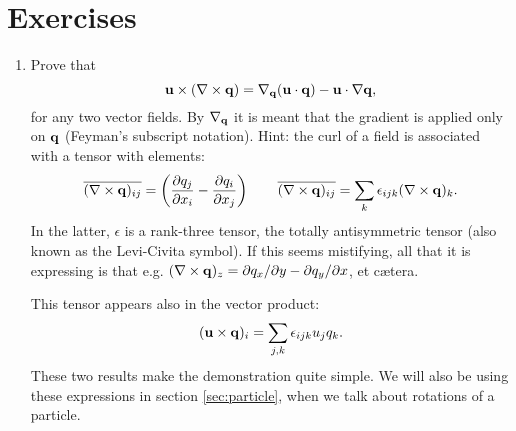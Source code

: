 \section{Exercises}
\label{sec:Euler_exercises}

\begin{enumerate}
\item \label{ex:vector_identity} Prove that
\[
\mathbf{u} \times ( \nabla\times \mathbf{q}) =
\nabla_{\mathbf{q}} (\mathbf{u}\cdot\mathbf{q}) - \mathbf{u} \cdot \nabla \mathbf{q} ,
\]
for any two vector fields. By $\nabla_{\mathbf{q}} $ it is meant that the
gradient is applied only on $\mathbf{q}$ (Feyman's subscript notation).
Hint: the curl of a field is associated with a tensor with elements:
\[
  \overline{( \nabla\times\mathbf{q} )_{ij}} =
  \left(
    \frac{\partial q_j}{\partial x_i} -
    \frac{\partial q_i}{\partial x_j}
  \right) \qquad
  \overline{( \nabla\times\mathbf{q} )_{ij}} =
  \sum_k \epsilon_{ijk}  ( \nabla\times\mathbf{q} )_k .
\]
In the latter, $\epsilon$ is a rank-three tensor, the totally
antisymmetric tensor (also known as the Levi-Civita symbol).  If this
seems mistifying, all that it is expressing is that e.g.  $
(\nabla\times\mathbf{q})_z= \partial q_x /\partial y - \partial q_y
/\partial x$, et c\ae tera.

This tensor appears also in the vector product:
\[
(\mathbf{u}\times\mathbf{q})_i= \sum_{j,k} \epsilon_{ijk} u_j q_k .
\]
These two results make the demonstration quite simple. We will
also be using these expressions in section \ref{sec:particle}, when
we talk about rotations of a particle.

\end{enumerate}
